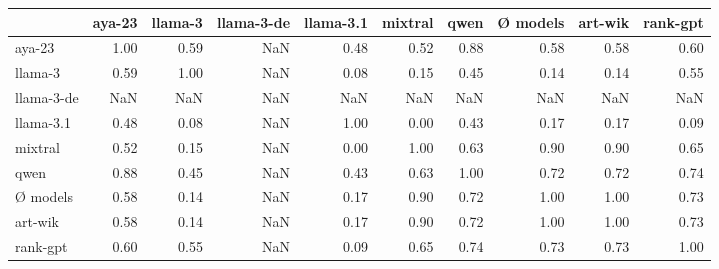 \begin{tabular}{lrrrrrrrrr}
\toprule
 & aya-23 & llama-3 & llama-3-de & llama-3.1 & mixtral & qwen & Ø models & art-wik & rank-gpt \\
\midrule
aya-23 & 1.00 & 0.59 & NaN & 0.48 & 0.52 & 0.88 & 0.58 & 0.58 & 0.60 \\
llama-3 & 0.59 & 1.00 & NaN & 0.08 & 0.15 & 0.45 & 0.14 & 0.14 & 0.55 \\
llama-3-de & NaN & NaN & NaN & NaN & NaN & NaN & NaN & NaN & NaN \\
llama-3.1 & 0.48 & 0.08 & NaN & 1.00 & 0.00 & 0.43 & 0.17 & 0.17 & 0.09 \\
mixtral & 0.52 & 0.15 & NaN & 0.00 & 1.00 & 0.63 & 0.90 & 0.90 & 0.65 \\
qwen & 0.88 & 0.45 & NaN & 0.43 & 0.63 & 1.00 & 0.72 & 0.72 & 0.74 \\
Ø models & 0.58 & 0.14 & NaN & 0.17 & 0.90 & 0.72 & 1.00 & 1.00 & 0.73 \\
art-wik & 0.58 & 0.14 & NaN & 0.17 & 0.90 & 0.72 & 1.00 & 1.00 & 0.73 \\
rank-gpt & 0.60 & 0.55 & NaN & 0.09 & 0.65 & 0.74 & 0.73 & 0.73 & 1.00 \\
\bottomrule
\end{tabular}
